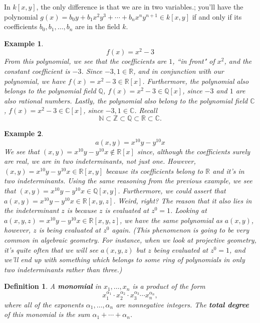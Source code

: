 \documentclass[12pt,reqno]{amsart}
\theoremstyle{plain}
\newtheorem{defi}{Definition}
\newtheorem{ex}{Example}
\newcommand{\rr}{\mathbb R}
\newcommand{\cc}{\mathbb C}
\newcommand{\nn}{\mathbb N}
\newcommand{\zz}{\mathbb Z}
\newcommand{\qq}{\mathbb Q}
\begin{document}
In $k[x,y]$, the only difference is that we are in two variables.; you'll have the polynomial $g(x) = b_0 y + b_1 x^2 y^3 + \cdots + b_n x^n y^{n+1} \in k[x, y]$ if and only if its coefficients $b_0, b_1, \ldots, b_n$ are in the field $k$.  

\begin{ex} $$f(x) = x^2 - 3$$ From this polynomial, we see that the coefficients are $1$, ``in front" of $x^2$, and the constant coefficient is $-3$. Since $ -3, 1 \in \rr$, and in conjunction with our polynomial, we have $f(x) = x^2 - 3 \in \rr[x]$. Furthermore, the polynomial also belongs to the polynomial field $\qq$,  $f(x) = x^2 - 3 \in \qq[x]$, since $-3$ and $1$ are also rational numbers. Lastly, the polynomial also belong to the polynomial field $\cc$, $f(x) = x^2 - 3 \in \cc[x]$, since $-3, 1 \in \cc$. Recall $$\nn \subset \zz \subset \qq \subset \rr \subset \cc .$$
\end{ex}

\begin{ex} $$a(x, y) = x^{10} y - y^{10} x $$
We see that $(x, y) = x^{10} y - y^{10} x \notin \rr[x]$ since, although the coefficients surely are real, we are in two indeterminants, not just one. However, $(x, y) = x^{10} y - y^{10} x \in \rr[x, y]$ because its coefficients belong to $\rr$ and it's in two indeterminants. Using the same reasoning from the previous example, we see that $(x, y) = x^{10} y - y^{10} x \in \qq[x,y]$. Furthermore, we could assert that $a(x, y) = x^{10}y-y^{10} x \in \rr[x, y, z ]$. Weird, right? The reason that it also lies in the indeterminant $z$ is because $z$ is evaluated at $z^0=1$. Looking at $a(x, y, z) = x^{10}y-y^{10} x \in \rr[x, y, z ]$, we have the same polynomial as $a(x, y)$, however, $z$ is being evaluated at $z^0$ again. (This phenomenon is going to be very common in algebraic geometry. For instance, when we look at projective geometry, it's quite often that we will see $a(x, y, z)$ but $z$ being evaluated at $z^0=1$, and we'll end up with something which belongs to some ring of polynomials in only two indeterminants rather than three.)
\end{ex}


\begin{defi} A \textup{\textbf{monomial}} in $x_1, \ldots, x_n$ is a product of the form \[ x_1^{\alpha_1} \cdot x_2^{\alpha_2} \cdot x_3^{\alpha_3} \cdots x_n^{\alpha_n},  \] where all of the exponents $\alpha_1, \ldots, \alpha_n$ are nonnegative integers. The \textup{\textbf{total degree}} of this monomial is the sum $\alpha_1 + \cdots + \alpha_n$. 
\end{defi}
\end{document}
